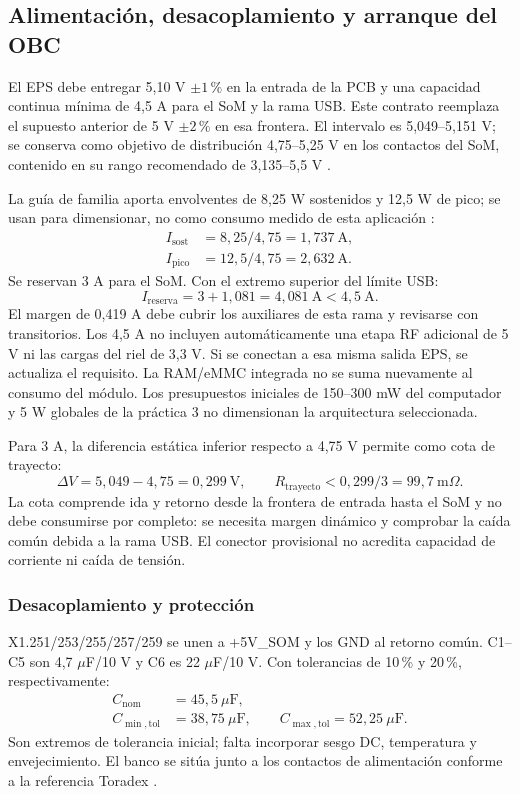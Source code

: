 \documentclass[11pt,letterpaper]{article}
\begin{document}
\subsection{Alimentación, desacoplamiento y arranque del OBC}
\label{sec:potencia_obc}
El EPS debe entregar 5,10 V $\pm1\,\%$ en la entrada de la PCB y una capacidad continua mínima de 4,5 A para el SoM y la rama USB. Este contrato reemplaza el supuesto anterior de 5 V $\pm2\,\%$ en esa frontera. El intervalo es 5,049--5,151 V; se conserva como objetivo de distribución 4,75--5,25 V en los contactos del SoM, contenido en su rango recomendado de 3,135--5,5 V \cite{verdinds}.

La guía de familia aporta envolventes de 8,25 W sostenidos y 12,5 W de pico; se usan para dimensionar, no como consumo medido de esta aplicación \cite{verdinguide}:
\begin{align}
I_{\mathrm{sost}}&=8,25/4,75=1,737\ \mathrm{A},\\
I_{\mathrm{pico}}&=12,5/4,75=2,632\ \mathrm{A}.
\end{align}
Se reservan 3 A para el SoM. Con el extremo superior del límite USB:
\begin{equation}
I_{\mathrm{reserva}}=3+1,081=4,081\ \mathrm{A}<4,5\ \mathrm{A}.
\end{equation}
El margen de 0,419 A debe cubrir los auxiliares de esta rama y revisarse con transitorios. Los 4,5 A no incluyen automáticamente una etapa RF adicional de 5 V ni las cargas del riel de 3,3 V. Si se conectan a esa misma salida EPS, se actualiza el requisito. La RAM/eMMC integrada no se suma nuevamente al consumo del módulo. Los presupuestos iniciales de 150--300 mW del computador y 5 W globales de la práctica 3 no dimensionan la arquitectura seleccionada.

Para 3 A, la diferencia estática inferior respecto a 4,75 V permite como cota de trayecto:
\begin{equation}
\Delta V=5,049-4,75=0,299\ \mathrm{V},\qquad
R_{\mathrm{trayecto}}<0,299/3=99,7\ \mathrm{m}\Omega.
\end{equation}
La cota comprende ida y retorno desde la frontera de entrada hasta el SoM y no debe consumirse por completo: se necesita margen dinámico y comprobar la caída común debida a la rama USB. El conector provisional no acredita capacidad de corriente ni caída de tensión.

\subsubsection{Desacoplamiento y protección}
X1.251/253/255/257/259 se unen a +5V\_SOM y los GND al retorno común. C1--C5 son 4,7 $\mu$F/10 V y C6 es 22 $\mu$F/10 V. Con tolerancias de 10\,\% y 20\,\%, respectivamente:
\begin{align}
C_{\mathrm{nom}}&=45,5\ \mu\mathrm{F},\\
C_{\min,\mathrm{tol}}&=38,75\ \mu\mathrm{F},\qquad
C_{\max,\mathrm{tol}}=52,25\ \mu\mathrm{F}.
\end{align}
Son extremos de tolerancia inicial; falta incorporar sesgo DC, temperatura y envejecimiento. El banco se sitúa junto a los contactos de alimentación conforme a la referencia Toradex \cite{verdinguide}.
\end{document}

